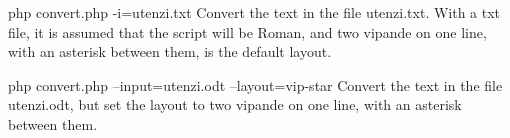 \documentclass[a4paper,10pt, oneside]{book}
\newcommand\AS[1]{{\citationfont\RLE{#1}}}
\begin{document}
php convert.php -i=utenzi.txt
Convert the text in the file utenzi.txt.  With a txt file, it is assumed that the script will be Roman, and two vipande on one line, with an asterisk between them, is the default layout.

php convert.php --input=utenzi.odt --layout=vip-star
Convert the text in the file utenzi.odt, but set the layout to two vipande on one line, with an asterisk between them.
















% 
% 
% 
% 
% 
% 
% 
\end{document}
